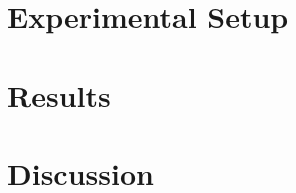 \documentclass[]{report}
\begin{document}
\chapter{Experimental Setup}

\chapter{Results}
\chapter{Discussion}
\end{document}
